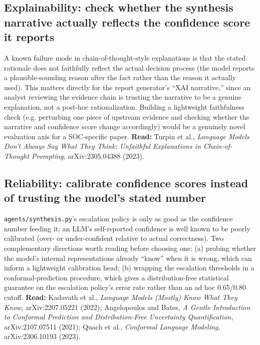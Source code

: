 \documentclass[11pt]{article}
\begin{document}
\subsection{Explainability: check whether the synthesis narrative actually reflects the confidence score it reports}
A known failure mode in chain-of-thought-style explanations is that the stated rationale does not faithfully reflect the actual decision process (the model reports a plausible-sounding reason after the fact rather than the reason it actually used). This matters directly for the report generator's ``XAI narrative,'' since an analyst reviewing the evidence chain is trusting the narrative to be a genuine explanation, not a post-hoc rationalization. Building a lightweight faithfulness check (e.g. perturbing one piece of upstream evidence and checking whether the narrative and confidence score change accordingly) would be a genuinely novel evaluation axis for a SOC-specific paper. \textbf{Read:} Turpin et al., \emph{Language Models Don't Always Say What They Think: Unfaithful Explanations in Chain-of-Thought Prompting}, arXiv:2305.04388 (2023).

\subsection{Reliability: calibrate confidence scores instead of trusting the model's stated number}
\texttt{agents/synthesis.py}'s escalation policy is only as good as the confidence number feeding it; an LLM's self-reported confidence is well known to be poorly calibrated (over- or under-confident relative to actual correctness). Two complementary directions worth reading before choosing one: (a) probing whether the model's internal representations already ``know'' when it is wrong, which can inform a lightweight calibration head; (b) wrapping the escalation thresholds in a conformal-prediction procedure, which gives a distribution-free statistical guarantee on the escalation policy's error rate rather than an ad hoc 0.65/0.80 cutoff. \textbf{Read:} Kadavath et al., \emph{Language Models (Mostly) Know What They Know}, arXiv:2207.05221 (2022); Angelopoulos and Bates, \emph{A Gentle Introduction to Conformal Prediction and Distribution-Free Uncertainty Quantification}, arXiv:2107.07511 (2021); Quach et al., \emph{Conformal Language Modeling}, arXiv:2306.10193 (2023).
\end{document}
